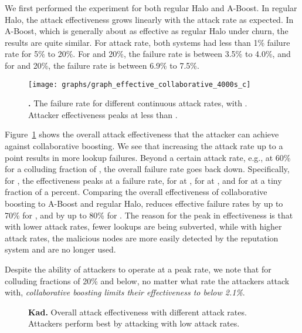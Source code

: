  We first performed the experiment for both regular
Halo and A-Boost. In regular Halo, the attack effectiveness grows
linearly with the attack rate as expected. In A-Boost, which is
generally about as effective as regular Halo under churn, the results
are quite similar. For  attack rate, both systems had less than
1\% failure rate for 5\% to 20\%. For  and 20\%, the
failure rate is between 3.5\% to 4.0\%, and for  and 20\%,
the failure rate is between 6.9\% to 7.5\%.

\begin{figure}[t!]
  \centering 
\texttt{[image: graphs/graph\_effective\_collaborative\_4000s\_c]}
  \caption{{\bf \hsys.} The failure rate for different continuous attack
    rates, with . Attacker effectiveness peaks at less than
    .}
  \label{fig:overall_collaborative} 
\end{figure}



Figure~\ref{fig:overall_collaborative} shows the overall attack
effectiveness that the attacker can achieve against collaborative
boosting. We see that increasing the attack rate up to a point results
in more lookup failures. Beyond a certain attack rate, e.g., at 60\% for
a colluding fraction of , the overall failure rate goes back
down. Specifically, for , the effectiveness peaks at a 
failure rate, for  at , for  at , and
for  at a tiny fraction of a percent. Comparing the overall
effectiveness of collaborative boosting to A-Boost and regular Halo,
\sys reduces effective failure rates by up to 70\% for ,
and by up to 80\% for .
The reason for the peak in effectiveness is that with lower attack
rates, fewer lookups are being subverted, while with higher attack
rates, the malicious nodes are more easily detected by the reputation
system and are no longer used.

Despite the ability of attackers to operate at a peak rate, we note that
for colluding fractions of 20\% and below, no matter what rate the
attackers attack with, \emph{collaborative boosting limits their
  effectiveness to below 2.1\%}.









\begin{figure}[t!]
\centering
\caption{{\bf Kad.} Overall attack effectiveness with different attack
   rates. Attackers perform best by attacking with low attack rates. }
\label{fig:kad_churn_ar_graphs}
\end{figure}

